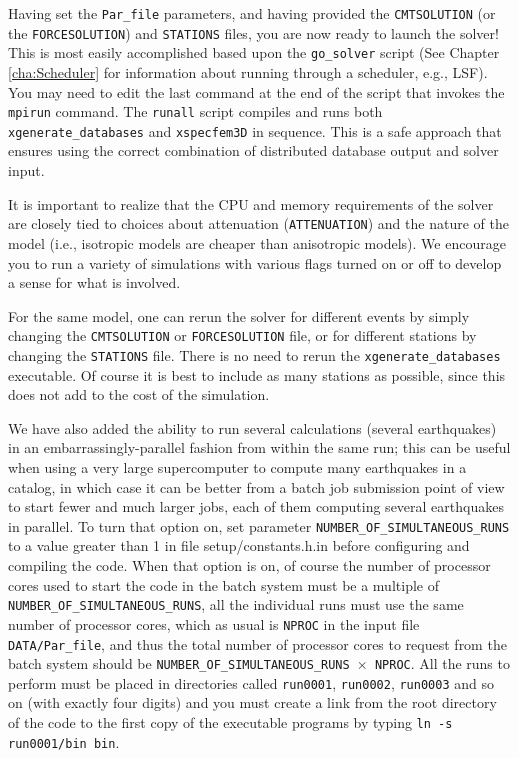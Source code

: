 Having set the \texttt{Par\_file} parameters, and having provided
the \texttt{CMTSOLUTION} (or the \texttt{FORCESOLUTION}) and \texttt{STATIONS}
files, you are now ready to launch the solver! This is most easily
accomplished based upon the \texttt{go\_solver} script (See Chapter
\ref{cha:Scheduler} for information about running through a scheduler,
e.g., LSF). You may need to edit the last command at the end of the
script that invokes the \texttt{mpirun} command. The \texttt{runall}
script compiles and runs both \texttt{xgenerate\_databases} and \texttt{xspecfem3D}
in sequence. This is a safe approach that ensures using the correct
combination of distributed database output and solver input.

It is important to realize that the CPU and memory requirements of
the solver are closely tied to choices about attenuation (\texttt{ATTENUATION})
and the nature of the model (i.e., isotropic models are cheaper than
anisotropic models). We encourage you to run a variety of simulations
with various flags turned on or off to develop a sense for what is
involved.

For the same model, one can rerun the solver for different events
by simply changing the \texttt{CMTSOLUTION} or \texttt{FORCESOLUTION}
file, or for different stations by changing the \texttt{STATIONS}
file. There is no need to rerun the \texttt{xgenerate\_databases}
executable. Of course it is best to include as many stations as possible,
since this does not add to the cost of the simulation.

We have also added the ability to run several calculations (several earthquakes)
in an embarrassingly-parallel fashion from within the same run;
this can be useful when using a very large supercomputer to compute
many earthquakes in a catalog, in which case it can be better from
a batch job submission point of view to start fewer and much larger jobs,
each of them computing several earthquakes in parallel.
To turn that option on, set parameter \texttt{NUMBER\_OF\_SIMULTANEOUS\_RUNS}
to a value greater than 1 in file setup/constants.h.in before
configuring and compiling the code.
When that option is on, of course the number of processor cores used to start
the code in the batch system must be a multiple of \texttt{NUMBER\_OF\_SIMULTANEOUS\_RUNS},
all the individual runs must use the same number of processor cores,
which as usual is \texttt{NPROC} in the input file \texttt{DATA/Par\_file},
and thus the total number of processor cores to request from the batch system
should be \texttt{NUMBER\_OF\_SIMULTANEOUS\_RUNS $\times$ NPROC}.
All the runs to perform must be placed in directories called \texttt{run0001}, \texttt{run0002}, \texttt{run0003} and so on (with exactly four digits)
and you must create a link from the root directory of the code
to the first copy of the executable programs by typing \texttt{ln -s run0001/bin bin}.


